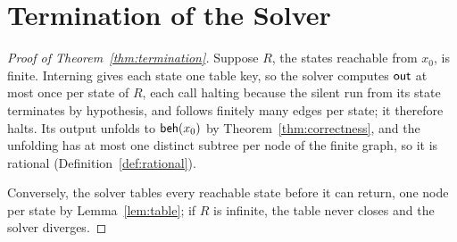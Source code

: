 \section{Termination of the Solver}\label{app:termination}
\begin{proof}[Proof of Theorem~\ref{thm:termination}]
  Suppose $R$, the states reachable from $x_0$, is finite. Interning gives each state one
  table key, so the solver computes $\mathsf{out}$ at most once per state of $R$, each call halting
  because the silent run from its state terminates by hypothesis, and follows finitely many
  edges per state; it therefore halts. Its output
  unfolds to $\mathsf{beh}(x_0)$ by Theorem~\ref{thm:correctness}, and the unfolding has at most
  one distinct subtree per node of the finite graph, so it is rational
  (Definition~\ref{def:rational}).

  Conversely, the solver tables every reachable state before it can return, one node per
  state by Lemma~\ref{lem:table}; if $R$ is infinite, the table never closes and the solver
  diverges.
\end{proof}

